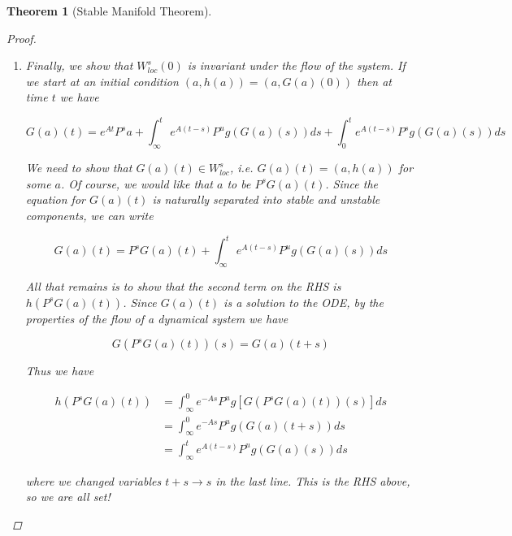 \documentclass{article}
\newtheorem{theorem}{Theorem}[section]
\begin{document}
\begin{theorem}[Stable Manifold Theorem]
\begin{proof}
\begin{enumerate}
Thus $u(t) = G(a)(t)$ is the unique solution to the system with initial condition $(a, h(a)) \in W^s_{loc}(0)$. Since $u(t) \in D$, $|e^{\beta t}u(t)|\leq \rho$, which implies for $t \geq 0$
\[
|u(t)|\leq \rho e^{-\beta t}
\]
Thus $u(t)$ decays exponentially to 0.

\item Finally, we show that $W^s_{loc}(0)$ is invariant under the flow of the system. If we start at an initial condition $(a, h(a)) = (a, G(a)(0))$ then at time $t$ we have 

\[
G(a)(t) = e^{At} P^s a + \int_\infty^t e^{A(t-s)} P^u g(G(a)(s)) ds + \int_0^t e^{A(t-s)} P^s g(G(a)(s)) ds
\]

We need to show that $G(a)(t) \in W^s_{loc}$, i.e. 
$G(a)(t) = (a, h(a))$ for some $a$. Of course, we would like that $a$ to be $P^s G(a)(t)$. Since the equation for $G(a)(t)$ is naturally separated into stable and unstable components, we can write

\[
G(a)(t) = P^s G(a)(t) + \int_\infty^t e^{A(t-s)} P^u g(G(a)(s)) ds
\]

All that remains is to show that the second term on the RHS is $h( P^s G(a)(t) )$. Since $G(a)(t)$ is a solution to the ODE, by the properties of the flow of a dynamical system we have

\[
G( P^s G(a)(t) )(s) = G(a)(t+s)
\] 

Thus we have

\begin{align*}
h( P^s G(a)(t) ) &= \int_\infty^0 e^{-As} P^u g[G(P^s G(a)(t))(s)] ds \\
&= \int_\infty^0 e^{-As} P^u g(G(a)(t+s)) ds \\
&= \int_\infty^t e^{A(t-s)} P^u g(G(a)(s)) ds
\end{align*}

where we changed variables $t + s \rightarrow s$ in the last line. This is the RHS above, so we are all set! 

\end{enumerate}
\end{proof} 
\end{theorem}
\end{document}
